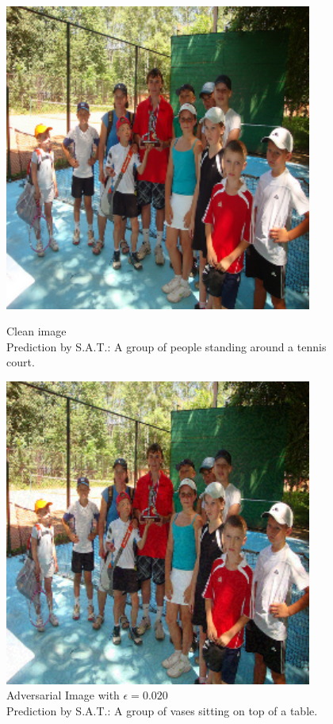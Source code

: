 \begin{figure}[ht]
    \centering
    \begin{minipage}{0.45\textwidth}
        \centering
        \includegraphics[width=0.9\textwidth]{figures/fast_method_group_of_people/group_of_people_0.000.png} %
        \caption*{Clean image\\Prediction by S.A.T.: A group of people standing around a tennis court.}
    \end{minipage}\hfill
    \begin{minipage}{0.45\textwidth}
        \centering
        \includegraphics[width=0.9\textwidth]{figures/fast_method_group_of_people/group_of_people_0.020.png} %
        \caption*{Adversarial Image with $\epsilon=0.020$\\Prediction by S.A.T.: A group of vases sitting on top of a table.}
    \end{minipage}
\end{figure}

